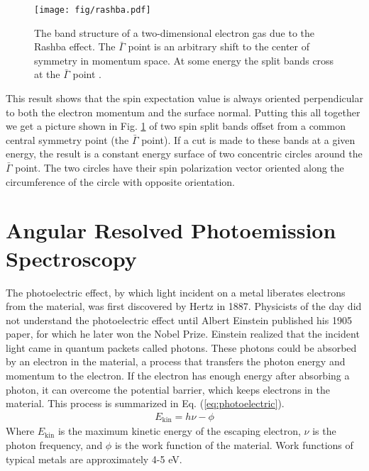 \documentclass[12pt]{article}
\begin{document}
\begin{figure}[th]
  \centering
  \texttt{[image: fig/rashba.pdf]}
  \caption{The band structure of a two-dimensional electron gas due to the Rashba effect.  The $\bar{\Gamma}$ point is an arbitrary shift to the center of symmetry in momentum space.  At some energy the split bands cross at the $\bar{\Gamma}$ point \cite{Dil}.}
  \label{fig:rashba}
\end{figure}
This result shows that the spin expectation value is always oriented perpendicular to both the electron momentum and the surface normal.
Putting this all together we get a picture shown in Fig. \ref{fig:rashba} of two spin split bands offset from a common central symmetry point (the $\bar{\Gamma}$ point).
If a cut is made to these bands at a given energy, the result is a constant energy surface of two concentric circles around the $\bar{\Gamma}$ point.
The two circles have their spin polarization vector oriented along the circumference of the circle with opposite orientation.

\section{Angular Resolved Photoemission Spectroscopy}
The photoelectric effect, by which light incident on a metal liberates electrons from the material, was first discovered by Hertz in 1887.
Physicists of the day did not understand the photoelectric effect until Albert Einstein published his 1905 paper, for which he later won the Nobel Prize.
Einstein realized that the incident light came in quantum packets called photons.
These photons could be absorbed by an electron in the material, a process that transfers the photon energy and momentum to the electron.
If the electron has enough energy after absorbing a photon, it can overcome the potential barrier, which keeps electrons in the material.
This process is summarized in Eq. (\ref{eq:photoelectric}).
\begin{align}
  \label{eq:photoelectric}
  E_{\text{kin}}=h\nu-\phi
\end{align}
Where $E_{\text{kin}}$ is the maximum kinetic energy of the escaping electron, $\nu$ is the photon frequency, and $\phi$ is the work function of the material.
Work functions of typical metals are approximately 4-5 eV.
\end{document}
